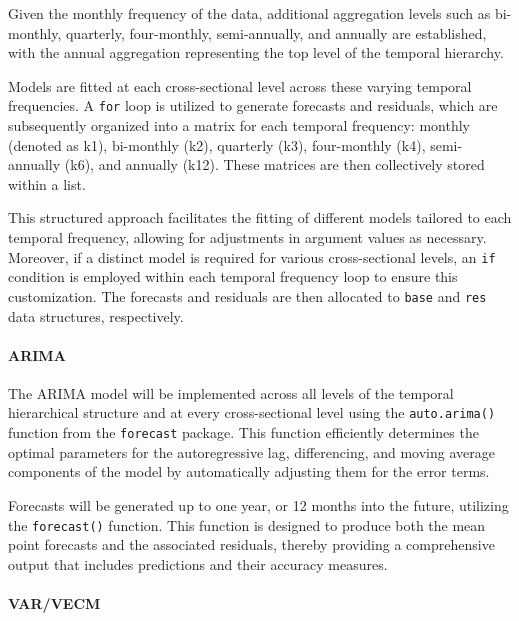 \documentclass[11pt,a4paper,]{article}
\begin{document}
Given the monthly frequency of the data, additional aggregation levels such as bi-monthly, quarterly, four-monthly, semi-annually, and annually are established, with the annual aggregation representing the top level of the temporal hierarchy.

Models are fitted at each cross-sectional level across these varying temporal frequencies. A \texttt{for} loop is utilized to generate forecasts and residuals, which are subsequently organized into a matrix for each temporal frequency: monthly (denoted as k1), bi-monthly (k2), quarterly (k3), four-monthly (k4), semi-annually (k6), and annually (k12). These matrices are then collectively stored within a list.

This structured approach facilitates the fitting of different models tailored to each temporal frequency, allowing for adjustments in argument values as necessary. Moreover, if a distinct model is required for various cross-sectional levels, an \texttt{if} condition is employed within each temporal frequency loop to ensure this customization. The forecasts and residuals are then allocated to \texttt{base} and \texttt{res} data structures, respectively.

\paragraph{ARIMA}\label{arima}

The ARIMA model will be implemented across all levels of the temporal hierarchical structure and at every cross-sectional level using the \texttt{auto.arima()} function from the \texttt{forecast} package. This function efficiently determines the optimal parameters for the autoregressive lag, differencing, and moving average components of the model by automatically adjusting them for the error terms.

Forecasts will be generated up to one year, or 12 months into the future, utilizing the \texttt{forecast()} function. This function is designed to produce both the mean point forecasts and the associated residuals, thereby providing a comprehensive output that includes predictions and their accuracy measures.

\paragraph{VAR/VECM}\label{varvecm}
\end{document}

